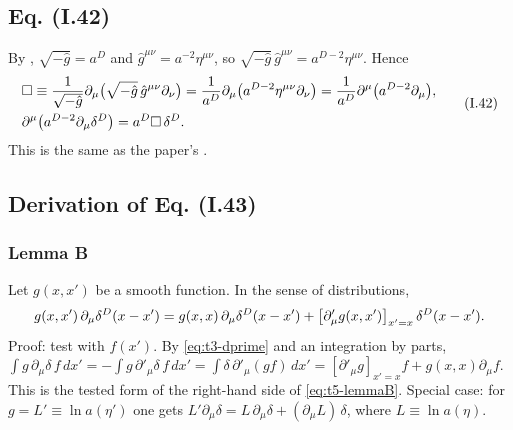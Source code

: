 \subsection{Eq. (I.42) \texorpdfstring{\tD}{}}\label{sec:t5-42}
By , \(\sqrt{-\hat g}=a^D\) and \(\hat g^{\mu\nu}=a^{-2}\eta^{\mu\nu}\), so
\(\sqrt{-\hat g}\,\hat g^{\mu\nu}=a^{D-2}\eta^{\mu\nu}\). Hence
\begin{equation*}\label{eq:t5-I42}
\begin{aligned}\relax&\square\equiv\frac1{\sqrt{-\hat g}}\partial_\mu\bigl(\sqrt{-\hat g}\,\hat g^{\mu\nu}\partial_\nu\bigr)
=\frac1{a^D}\partial_\mu\bigl(a^{D-2}\eta^{\mu\nu}\partial_\nu\bigr)=\frac1{a^D}\partial^\mu\bigl(a^{D-2}\partial_\mu\bigr),\\
&\partial^\mu\bigl(a^{D-2}\partial_\mu\delta^D\bigr)=a^D\square\,\delta^D .\end{aligned}
\tag{I.42}
\end{equation*}
This is the same as the paper's  \chIIok.

\subsection{Derivation of Eq. (I.43) \texorpdfstring{\tD}{}}

\subsubsection{Lemma B}
Let \(g(x,x')\) be a smooth function. In the sense of distributions,
\begin{equation}\label{eq:t5-lemmaB}
g(x,x')\,\partial_\mu\delta^D(x-x')=g(x,x)\,\partial_\mu\delta^D(x-x')+\bigl[\partial'_\mu g(x,x')\bigr]_{x'=x}\,\delta^D(x-x') .
\end{equation}
Proof: test with \(f(x')\). By \eqref{eq:t3-dprime} and an integration by parts,
\(\int g\,\partial_\mu\delta\,f\,dx'=-\int g\,\partial'_\mu\delta\,f\,dx'=\int\delta\,\partial'_\mu(gf)\,dx'
=[\partial'_\mu g]_{x'=x}f+g(x,x)\partial_\mu f\). This is the tested form of the right-hand side
of \eqref{eq:t5-lemmaB}.
Special case: for \(g=L'\equiv\ln a(\eta')\) one gets \(L'\partial_\mu\delta=L\,\partial_\mu\delta+(\partial_\mu L)\,\delta\),
where \(L\equiv\ln a(\eta)\).

